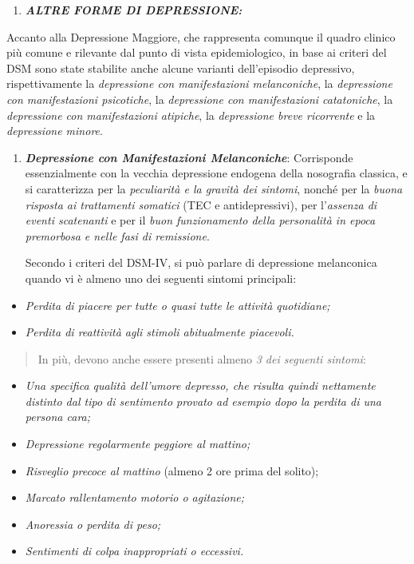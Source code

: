 \documentclass[]{article}
\begin{document}
\begin{enumerate}
\def\labelenumi{\arabic{enumi}.}
\item
  \textbf{\emph{ALTRE FORME DI DEPRESSIONE:}}
\end{enumerate}

Accanto alla Depressione Maggiore, che rappresenta comunque il quadro
clinico più comune e rilevante dal punto di vista epidemiologico, in
base ai criteri del DSM sono state stabilite anche alcune varianti
dell'episodio depressivo, rispettivamente la \emph{depressione con
manifestazioni melanconiche}, la \emph{depressione con manifestazioni
psicotiche}, la \emph{depressione con manifestazioni catatoniche}, la
\emph{depressione con manifestazioni atipiche}, la \emph{depressione
breve ricorrente} e la \emph{depressione minore}.

\begin{enumerate}
\def\labelenumi{\arabic{enumi}.}
\item
  \textbf{\emph{Depressione con Manifestazioni Melanconiche}}:
  Corrisponde essenzialmente con la vecchia depressione endogena della
  nosografia classica, e si caratterizza per la \emph{peculiarità e la
  gravità dei sintomi}, nonché per la \emph{buona risposta ai
  trattamenti somatici} (TEC e antidepressivi), per l'\emph{assenza di
  eventi scatenanti} e per il \emph{buon funzionamento della personalità
  in epoca premorbosa e nelle fasi di remissione}.

  Secondo i criteri del DSM-IV, si può parlare di depressione
  melanconica quando vi è almeno uno dei seguenti sintomi principali:
\end{enumerate}

\begin{itemize}
\item
  \emph{Perdita di piacere per tutte o quasi tutte le attività
  quotidiane;}
\item
  \emph{Perdita di reattività agli stimoli abitualmente piacevoli.}
\end{itemize}

\begin{quote}
In più, devono anche essere presenti almeno \emph{3 dei seguenti
sintomi}:
\end{quote}

\begin{itemize}
\item
  \emph{Una specifica qualità dell'umore depresso, che risulta quindi
  nettamente distinto dal tipo di sentimento provato ad esempio dopo la
  perdita di una persona cara;}
\item
  \emph{Depressione regolarmente peggiore al mattino;}
\item
  \emph{Risveglio precoce al mattino} (almeno 2 ore prima del solito);
\item
  \emph{Marcato rallentamento motorio o agitazione;}
\item
  \emph{Anoressia o perdita di peso;}
\item
  \emph{Sentimenti di colpa inappropriati o eccessivi.}
\end{itemize}
\end{document}

